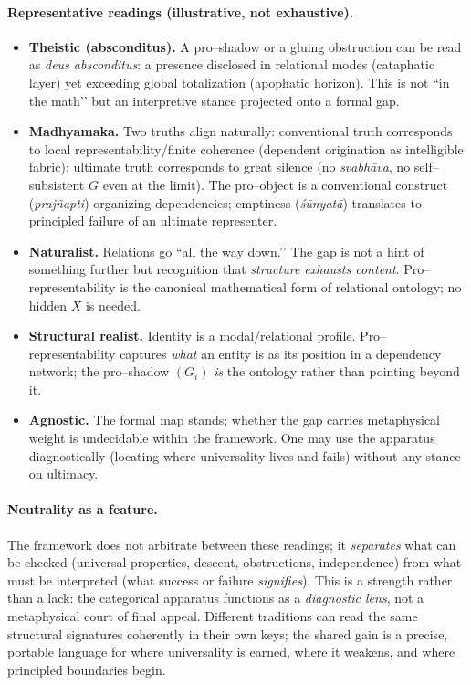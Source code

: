 \documentclass[11pt]{article}
\theoremstyle{upright}
\begin{document}
\paragraph{Representative readings (illustrative, not exhaustive).}
\begin{itemize}[leftmargin=2em]
\item \textbf{Theistic (absconditus).} A pro–shadow or a gluing obstruction can be read as \emph{deus absconditus}: a presence disclosed in relational modes (cataphatic layer) yet exceeding global totalization (apophatic horizon). This is not “in the math’’ but an interpretive stance projected onto a formal gap.
\item \textbf{Madhyamaka.} Two truths align naturally: conventional truth corresponds to local representability/finite coherence (dependent origination as intelligible fabric); ultimate truth corresponds to great silence (no \emph{svabhāva}, no self–subsistent \(G\) even at the limit). The pro–object is a conventional construct (\emph{prajñapti}) organizing dependencies; emptiness (\emph{śūnyatā}) translates to principled failure of an ultimate representer.
\item \textbf{Naturalist.} Relations go “all the way down.’’ The gap is not a hint of something further but recognition that \emph{structure exhausts content}. Pro–representability is the canonical mathematical form of relational ontology; no hidden \(X\) is needed.
\item \textbf{Structural realist.} Identity is a modal/relational profile. Pro–representability captures \emph{what} an entity is as its position in a dependency network; the pro–shadow \((G_i)\) \emph{is} the ontology rather than pointing beyond it.
\item \textbf{Agnostic.} The formal map stands; whether the gap carries metaphysical weight is undecidable within the framework. One may use the apparatus diagnostically (locating where universality lives and fails) without any stance on ultimacy.
\end{itemize}

\paragraph{Neutrality as a feature.}
The framework does not arbitrate between these readings; it \emph{separates} what can be checked (universal properties, descent, obstructions, independence) from what must be interpreted (what success or failure \emph{signifies}). This is a strength rather than a lack: the categorical apparatus functions as a \emph{diagnostic lens}, not a metaphysical court of final appeal. Different traditions can read the same structural signatures coherently in their own keys; the shared gain is a precise, portable language for where universality is earned, where it weakens, and where principled boundaries begin.
\end{document}
